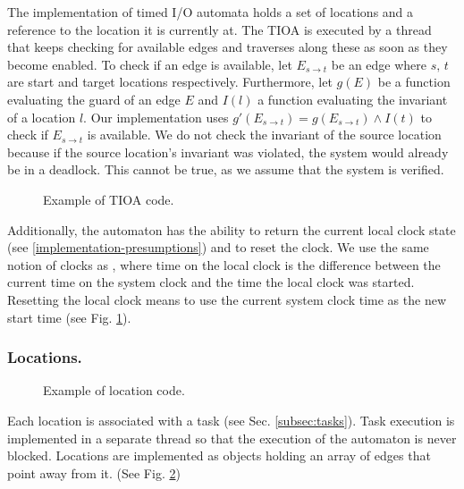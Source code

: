 The implementation of timed I/O automata holds a set of locations and a
reference to the location it is currently at. The TIOA is executed by a thread
that keeps checking for available edges and traverses along these as soon as
they become enabled. To check if an edge is available, let $E_{s\rightarrow t}$
be an edge where $s,\, t$ are start and target locations
respectively. Furthermore, let $g(E)$ be a function evaluating the guard of an
edge $E$ and $I(l)$ a function evaluating the invariant of a location $l$. Our
implementation uses $g'(E_{s\rightarrow t})=g(E_{s\rightarrow t})\wedge I(t)$ to
check if $E_{s\rightarrow t}$ is available. We do not check the invariant of the
source location because if the source location's invariant was violated, the
system would already be in a deadlock. This cannot be true, as we assume that
the system is verified.

\begin{figure}[t]

\caption{Example of TIOA code.}
\label{tioa-example}
\end{figure}

Additionally, the automaton has the ability to return the current
local clock state (see \ref{implementation-presumptions}) and to
reset the clock. We use the same notion of clocks as \cite{amnell_code_2002},
where time on the local clock is the difference between the current
time on the system clock and the time the local clock was started.
Resetting the local clock means to use the current system clock time
as the new start time (see Fig. \ref{tioa-example}).

\subsubsection{Locations.}

\begin{figure}[t]

\caption{Example of location code.}
\label{location-example}
\end{figure}

Each location is associated with a task (see Sec. \ref{subsec:tasks}). Task
execution is implemented in a separate thread so that the execution of the
automaton is never blocked. Locations are implemented as objects holding an
array of edges that point away from it. (See Fig. \ref{location-example})


